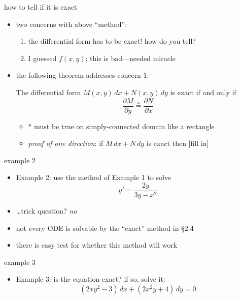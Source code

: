 \documentclass{beamer}
\begin{document}
\begin{frame}{how to tell if it is exact}

\begin{itemize}
\item two concerns with above ``method'':
    \begin{enumerate}
    \item the differential form has to be exact!  how do you tell?
    \item I guessed $f(x,y)$; this is bad---needed miracle
    \end{enumerate}
\item the following theorem addresses concern 1:
\begin{theorem}
The differential form $M(x,y)\,dx + N(x,y)\,dy$ is exact if and only if
    $$\frac{\partial M}{\partial y} \stackrel{\ast}{=} \frac{\partial N}{\partial x}$$
\end{theorem}
    \begin{itemize}
    \item $\ast$ must be true on simply-connected domain like a rectangle
    \item \emph{proof of one direction}: if $M\,dx + N\,dy$ is exact then [fill in]
    \end{itemize}

\vspace{20mm}
\end{itemize}
\end{frame}


\begin{frame}{example 2}

\begin{itemize}
\item Example 2: use the method of Example 1 to solve
    $$y' = \frac{2y}{3y-x^2}$$

\vspace{40mm}
\item \dots trick question? \emph{no}
\item not every ODE is solvable by the ``exact'' method in \S 2.4
\item there is easy test for whether this method will work
\end{itemize}
\end{frame}


\begin{frame}{example 3}

\begin{itemize}
\item Example 3: is the equation exact?  if so, solve it:
    $$(2xy^2-3)\,dx + (2x^2y+4)\,dy = 0$$
\end{itemize}

\vspace{60mm}
\end{frame}
\end{document}
